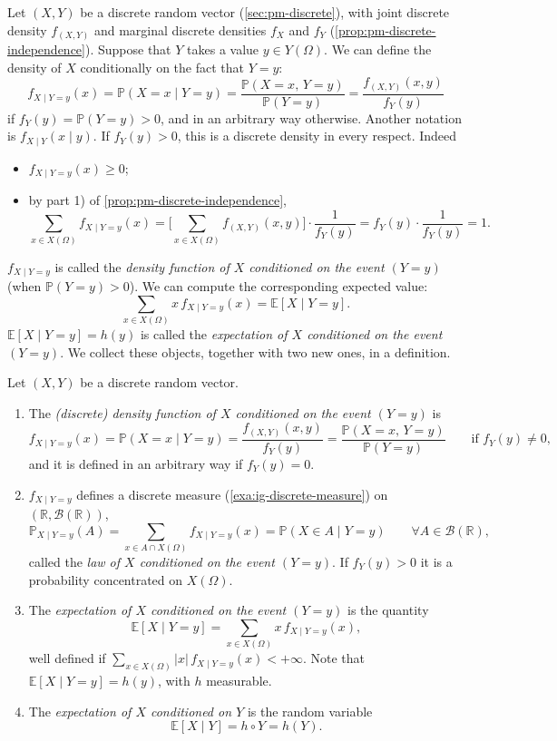 Let $(X,Y)$ be a discrete random vector (\cref{sec:pm-discrete}), with joint discrete density
$f_{(X,Y)}$ and marginal discrete densities $f_X$ and $f_Y$
(\cref{prop:pm-discrete-independence}). Suppose that $Y$ takes a value $y\in Y(\Omega)$. We can
define the density of $X$ conditionally on the fact that $Y=y$:
\[
  f_{X\mid Y=y}(x)=\mathbb P(X=x\mid Y=y)=\frac{\mathbb P(X=x,\,Y=y)}{\mathbb P(Y=y)}
  =\frac{f_{(X,Y)}(x,y)}{f_Y(y)}
\]
if $f_Y(y)=\mathbb P(Y=y)>0$, and in an arbitrary way otherwise. Another notation is $f_{X\mid Y}(x\mid y)$. If $f_Y(y)>0$,
this is a discrete density in every respect. Indeed
\begin{itemize}
  \item $f_{X\mid Y=y}(x)\ge0$;
  \item by part 1) of \cref{prop:pm-discrete-independence},
    \[
      \sum_{x\in X(\Omega)}f_{X\mid Y=y}(x)=\Big[\sum_{x\in X(\Omega)}f_{(X,Y)}(x,y)\Big]\cdot\frac1{f_Y(y)}
      =f_Y(y)\cdot\frac1{f_Y(y)}=1 .
    \]
\end{itemize}
$f_{X\mid Y=y}$ is called the \emph{density function of $X$ conditioned on the event $(Y=y)$}
(when $\mathbb P(Y=y)>0$). We can compute the corresponding expected value:
\[
  \sum_{x\in X(\Omega)}x\,f_{X\mid Y=y}(x)=\mathbb E[X\mid Y=y].
\]
$\mathbb E[X\mid Y=y]=h(y)$ is called the \emph{expectation of $X$ conditioned on the event
$(Y=y)$}. We collect these objects, together with two new ones, in a definition.

\begin{definition}\label{def:ce-discrete}
Let $(X,Y)$ be a discrete random vector.
\begin{enumerate}[label=\arabic*)]
  \item The \emph{(discrete) density function of $X$ conditioned on the event $(Y=y)$} is
    \[
      f_{X\mid Y=y}(x)=\mathbb P(X=x\mid Y=y)=\frac{f_{(X,Y)}(x,y)}{f_Y(y)}
      =\frac{\mathbb P(X=x,\,Y=y)}{\mathbb P(Y=y)}\qquad\text{if }f_Y(y)\ne0,
    \]
    and it is defined in an arbitrary way if $f_Y(y)=0$.
  \item $f_{X\mid Y=y}$ defines a discrete measure (\cref{exa:ig-discrete-measure}) on
    $(\mathbb R,\mathcal B(\mathbb R))$,
    \[
      \mathbb P_{X\mid Y=y}(A)=\sum_{x\in A\cap X(\Omega)}f_{X\mid Y=y}(x)=\mathbb P(X\in A\mid Y=y)
      \qquad\forall A\in\mathcal B(\mathbb R),
    \]
    called the \emph{law of $X$ conditioned on the event $(Y=y)$}. If $f_Y(y)>0$ it is a
    probability concentrated on $X(\Omega)$.
  \item The \emph{expectation of $X$ conditioned on the event $(Y=y)$} is the quantity
    \[
      \mathbb E[X\mid Y=y]=\sum_{x\in X(\Omega)}x\,f_{X\mid Y=y}(x),
    \]
    well defined if $\sum_{x\in X(\Omega)}|x|\,f_{X\mid Y=y}(x)<+\infty$. Note that
    $\mathbb E[X\mid Y=y]=h(y)$, with $h$ measurable.
  \item The \emph{expectation of $X$ conditioned on $Y$} is the random variable
    \[
      \mathbb E[X\mid Y]=h\circ Y=h(Y).
    \]
\end{enumerate}
\end{definition}

